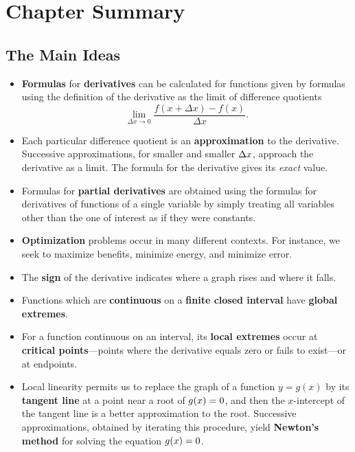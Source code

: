 \section{Chapter Summary}
\label{sec:chapter-summary}

\subsection{The Main Ideas}
\label{subsec:the-main-ideas}

\begin{itemize}

\item {\bf Formulas} for {\bf derivatives} can be calculated for
  functions given by formulas using the definition of the derivative
  as the limit of difference quotients
\[
\lim_{\Delta x \rightarrow 0} \frac{f(x+\Delta x)-f(x)}{\Delta x}.
\]

\item Each particular difference quotient is an {\bf approximation} to
  the derivative.  Successive approximations, for smaller and smaller
  $\Delta x\/$, approach the derivative as a limit.  The formula for
  the derivative gives its {\em exact\/} value.

\item Formulas for {\bf partial derivatives} are obtained using the
  formulas for derivatives of functions of a single variable by simply
  treating all variables other than the one of interest as if they
  were constants.

\item {\bf Optimization} problems occur in many different contexts.
  For instance, we seek to maximize benefits, minimize energy, and
  minimize error.

\item The {\bf sign} of the derivative indicates where a graph rises
  and where it falls.

\item Functions which are {\bf continuous} on a {\bf finite closed
  interval} have {\bf global extremes}.

\item For a function continuous on an interval, its {\bf local
  extremes} occur at {\bf critical points}---points where the
  derivative equals zero or fails to exist---or at endpoints.

\item Local linearity permits us to replace the graph of a function
  $y=g(x)$ by its {\bf tangent line} at a point near a root of
  $g(x)=0\/$, and then the $x$-intercept of the tangent line is a
  better approximation to the root.  Successive approximations,
  obtained by iterating this procedure, yield {\bf Newton's method}
  for solving the equation $g(x)=0\/$.

\end{itemize}

